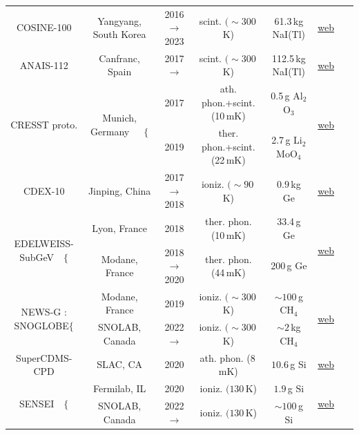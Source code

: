 \begin{table}[p]
\begin{center}
{\begin{tabular}{ccccccc}
{\sc COSINE-100} & Yangyang, South Korea & 2016 $\to$ 2023 &   scint. $(\sim300\,$K) & 61.3\,kg NaI(Tl) &  \href{http://cosine.yale.edu/home}{web} &~\cite{COSINE}
 \\
 
 {\sc ANAIS-112} & Canfranc, Spain & 2017 $\to$ & scint. $(\sim300\,$K)  &  112.5\,kg NaI(Tl) & \href{http://gifna.unizar.es/anais}{web} & \cite{ANAIS}
\\

\multirow{2}{*}{{\sc CRESST proto.}} & \multirow{2}{*}{Munich, Germany~~~$\Big\{$} & 2017 &  ath. phon.+scint. (10\,mK) & 0.5\,g Al${}_2$O${}_3$ & \multirow{2}{*}{\href{https://www.cresst.de}{web}} & \multirow{2}{*}{\cite{CRESST-proto}}
\\

 &  & 2019 &  ther. phon.+scint. (22\,mK)& 2.7\,g Li${}_2$MoO${}_4$ &  & 
\\

{\sc CDEX-10} & Jinping, China & 2017 $\to$ 2018 &  ioniz. $(\sim 90\,$K) & $0.9$\,kg Ge&  \href{http://cdex.ep.tsinghua.edu.cn}{web} & \cite{CDEX-10} \\


\multirow{2}{*}{{\sc EDELWEISS-SubGeV}~~$\Big\{$} & Lyon, France & 2018 & ther. phon. (10\,mK) & 33.4\,g Ge & \multirow{2}{*}{\href{http://edelweiss.in2p3.fr}{web}} & \multirow{2}{*}{\cite{EDELWEISS-SubGeV}}
\\
 & Modane, France & 2018 $\to$ 2020 & ther. phon. (44\,mK) & 200\,g Ge & & 
\\

\multirow{2}{*}{{\sc NEWS-G : SNOGLOBE}$\Big\{$} & Modane, France & 2019 &  ioniz. $(\sim300\,$K) & $\sim100\,$g CH${}_4$ &  \multirow{2}{*}{\href{https://www.queensu.ca/physics/news-g//}{web}} & \multirow{2}{*}{\cite{NEWS-G:SNOGLOBE}} \\

& SNOLAB, Canada & 2022 $\to$ &  ioniz. $(\sim300\,$K) & $\sim2\,$kg CH${}_4$ &   &  \\

{\sc SuperCDMS-CPD} & SLAC, CA & 2020 & ath. phon. (8\,mK)  & $10.6\,$g Si & \href{https://supercdms.slac.stanford.edu}{web} & \cite{SuperCDMS-CPD} \\

\multirow{2}{*}{{\sc SENSEI}~~$\Big\{$} & Fermilab, IL & 2020 &  ioniz. $(130\,$K) & $1.9$\,g Si &  \multirow{2}{*}{\href{https://sensei-skipper.github.io}{web}} & \multirow{2}{*}{\cite{SENSEI}}
\\
& SNOLAB, Canada & 2022 $\to$  &  ioniz. $(130\,$K) & $\sim 100$\,g Si &   & 
\\


\end{tabular}}
\end{center}
\end{table}
